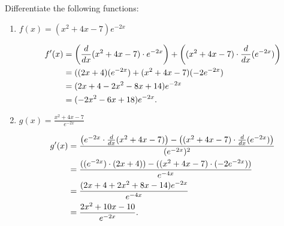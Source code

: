\documentclass[handout,nooutcomes]{ximera}
\begin{document}
\begin{problem}
Differentiate the following functions:

	\begin{enumerate}
	
	\item  $f(x) = (x^2 + 4x - 7) e^{-2x}$
			\begin{freeResponse}
			\begin{align*}
			f'(x) &= \left( \frac{d}{dx}(x^2 + 4x - 7) \cdot e^{-2x} \right) + \left((x^2 + 4x - 7) \cdot \frac{d}{dx}(e^{-2x}) \right)  \\
			&= ((2x+4)(e^{-2x}) + (x^2 + 4x - 7)(-2e^{-2x})  \\
			&= (2x + 4 - 2x^2 - 8x + 14)e^{-2x}  \\
			&= (-2x^2 - 6x + 18)e^{-2x}.
			\end{align*}
			\end{freeResponse}
			
			
			
	\item  $g(x) = \frac{x^2 + 4x - 7}{e^{-2x}}$
			\begin{freeResponse}
			\begin{align*}
			g'(x) &= \frac{\left( e^{-2x} \cdot \frac{d}{dx}(x^2 + 4x - 7) \right) - \left( (x^2 + 4x - 7) \cdot \frac{d}{dx}(e^{-2x}) \right)}{(e^{-2x})^2}  \\
			&= \frac{((e^{-2x}) \cdot (2x+4)) - ((x^2 + 4x - 7) \cdot (-2e^{-2x}))}{e^{-4x}}  \\
			&= \frac{(2x + 4 + 2x^2 + 8x - 14)e^{-2x}}{e^{-4x}}  \\
			&= \frac{2x^2 + 10x - 10}{e^{-2x}}.
			\end{align*}
			\end{freeResponse}
			
			
			
			
	\end{enumerate}		
\end{problem}
	
	
	
	
			
			
\end{document}
